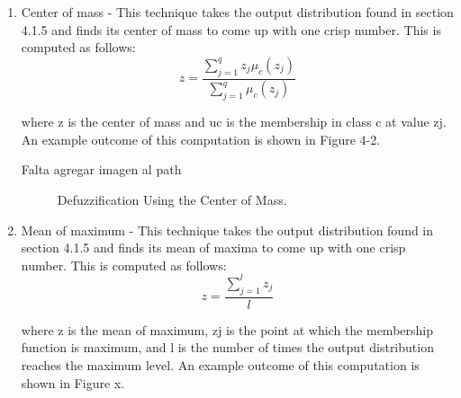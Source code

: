 \begin{enumerate}
\item  Center of mass - This technique takes the output
distribution found in section 4.1.5 and finds its center of mass to come up with
one crisp number. This is computed as follows:
\begin{equation}\label{eq:centerM}
\displaystyle z=\frac{\sum_{j=1}^qz_j\mu_c(z_j)}{\sum_{j=1}^q\mu_c(z_j)}
\end{equation}

where z is the center of mass and uc is the membership in class c at value zj.
An example outcome of this computation is shown in Figure 4-2.


Falta agregar imagen al path
\begin{figure}
\captionsetup{justification=centering,margin=2cm}
\centering
\setlength\fboxsep{0pt}
\setlength\fboxrule{0.7pt}
\caption{Defuzzification Using the Center of Mass.}
\label{fig:centerMass}
\end{figure}



\item Mean of maximum - This technique takes the output distribution found in section
4.1.5 and finds its mean of maxima to come up with one crisp number. This is
computed as follows:
\begin{equation}\label{eq:centerM}
\displaystyle z=\frac{\sum_{j=1}^lz_j}{l}
\end{equation}

where z is the mean of maximum, zj is the point at which the membership function
is maximum, and l is the number of times the output distribution reaches the
maximum level. An example outcome of this computation is shown in Figure x.


\end{enumerate}
